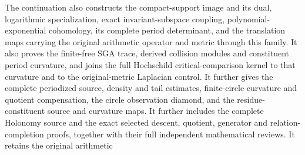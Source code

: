 The continuation also constructs the compact-support image and its dual,
logarithmic specialization, exact invariant-subspace coupling,
polynomial-exponential cohomology, its complete period determinant,
and the translation maps carrying the original arithmetic operator
and metric through this family.
It also proves the finite-free SGA trace, derived collision modules
and constituent period curvature, and joins the full Hochschild
critical-comparison kernel to that curvature and to the
original-metric Laplacian control.
It further gives the complete periodized source, density and tail estimates,
finite-circle curvature and quotient compensation, the circle observation
diamond, and the residue-constituent source and curvature maps.
It further includes the complete Holonomy source and the exact selected
descent, quotient, generator and relation-completion proofs, together
with their full independent mathematical reviews.
It retains the original arithmetic